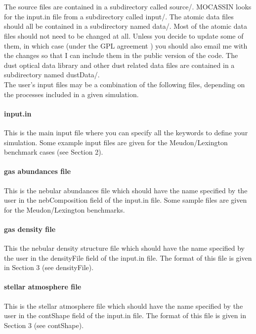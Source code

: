 \documentclass[11pt]{article}
\begin{document}
\pagebreak

\\

\\

    The source files are contained in a subdirectory called source/.
    MOCASSIN looks for the input.in file from a subdirectory called input/. 
    The atomic data files should all be contained in a subdirectory named data/. 
    Most of the atomic data files should not need 
    to be changed at all. Unless you decide to update some of them, in which case 
    (under the GPL agreement ) you should also email me with the changes so that 
    I can include them in the public version of the code. 
    The dust optical data library and other dust related data files are contained 
    in a subdirectory named dustData/.\\

    The user's input files may be a combination of the following files, 
    depending on the processes included in a given simulation.\\

\paragraph{    input.in }
    This is the main input file where you can specify all the keywords to define
    your simulation. Some example input files are given for the Meudon/Lexington
    benchmark cases (see Section 2).  

\paragraph{     gas abundances file}
    This is the nebular abundances file which should have the name specified by
    the user in the nebComposition field of the input.in file. Some sample files 
    are given for the Meudon/Lexington benchmarks.
    
\paragraph{     gas density file}
    This the nebular density structure file which should have the name specified by
    the user in the densityFile field of the input.in file. The format of this file
    is given in Section 3 (see densityFile). 

\paragraph{     stellar atmosphere file}
    This is the stellar atmosphere file which should have the name specified by
    the user in the contShape field of the input.in file. The format of this file 
    is given in Section 3 (see contShape). 
\end{document}
